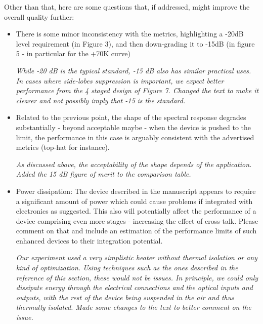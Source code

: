 \documentclass[]{article}
\begin{document}
Other than that, here are some questions that, if addressed, might improve the overall quality further:
\begin{itemize}
\item There is some minor inconsistency with the metrics, highlighting a -20dB level requirement (in Figure 3), and then down-grading it to -15dB (in figure 5 - in particular for the +70K curve)

\emph{While -20 dB is the typical standard, -15 dB also has similar practical uses. In cases where side-lobes suppression is important, we expect better performance from the 4 staged design of Figure 7. Changed the text to make it clearer and not possibly imply that -15 is the standard.}

\item Related to the previous point, the shape of the spectral response degrades substantially - beyond acceptable maybe - when the device is pushed to the limit, the performance in this case is arguably consistent with the advertised metrics (top-hat for instance).

\emph{As discussed above, the acceptability of the shape depends of the application. Added the 15 dB figure of merit to the comparison table.}

\item Power dissipation: The device described in the manuscript appears to require a significant amount of power which could cause problems if integrated with electronics as suggested. This also will potentially affect the performance of a device comprising even more stages - increasing the effect of cross-talk. Please comment on that and include an estimation of the performance limits of such enhanced devices to their integration potential.

\emph{Our experiment used a very simplistic heater without thermal isolation or any kind of optimization. Using techniques such as the ones described in the reference of this section, these would not be issues. In principle, we could only dissipate energy through the electrical connections and the optical inputs and outputs, with the rest of the device being suspended in the air and thus thermally isolated. Made some changes to the text to better comment on the issue.}

\end{itemize}
\end{document}
